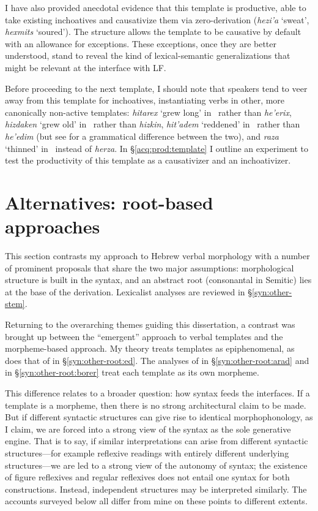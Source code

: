 I have also provided anecdotal evidence that this template is productive, able to take existing inchoatives and causativize them via zero-derivation (\emph{hezi'a} `sweat', \emph{hexmits} `soured'). The structure allows the template to be causative by default with an allowance for exceptions. These exceptions, once they are better understood, stand to reveal the kind of lexical-semantic generalizations that might be relevant at the interface with LF. 

Before proceeding to the next template, I should note that speakers tend to veer away from this template for inchoatives, instantiating verbs in other, more canonically non-active templates: \emph{hitarex} `grew long' in \thit~rather than \emph{he'erix}, \emph{hizdaken} `grew old' in \thit~rather than \emph{hizkin}, \emph{hit'adem} `reddened' in \thit~rather than \emph{he'edim} (but see \citealt[22]{doron03} for a grammatical difference between the two), and \emph{raza} `thinned' in \tkal~instead of \emph{herza}. In \S\ref{acq:prod:template} I outline an experiment to test the productivity of this template as a causativizer and an inchoativizer.





\section{Alternatives: root-based approaches}\label{syn:other-root}
This section contrasts my approach to Hebrew verbal morphology with a number of prominent proposals that share the two major assumptions: morphological structure is built in the syntax, and an abstract root (consonantal in Semitic) lies at the base of the derivation. Lexicalist analyses are reviewed in \S\ref{syn:other-stem}. 

Returning to the overarching themes guiding this dissertation, a contrast was brought up between the ``emergent'' approach to verbal templates and the morpheme-based approach. My theory treats templates as epiphenomenal, as does that of \cite{doron03} in \S\ref{syn:other-root:ed}. The analyses of \cite{arad05} in \S\ref{syn:other-root:arad} and \cite{borer13oup} in \S\ref{syn:other-root:borer} treat each template as its own morpheme.

This difference relates to a broader question: how syntax feeds the interfaces. If a template is a morpheme, then there is no strong architectural claim to be made. But if different syntactic structures can give rise to identical morphophonology, as I claim, we are forced into a strong view of the syntax as the sole generative engine. That is to say, if similar interpretations can arise from different syntactic structures---for example reflexive readings with entirely different underlying structures---we are led to a strong view of the autonomy of syntax; the existence of figure reflexives and regular reflexives does not entail one syntax for both constructions. Instead, independent structures may be interpreted similarly. The accounts surveyed below all differ from mine on these points to different extents.

